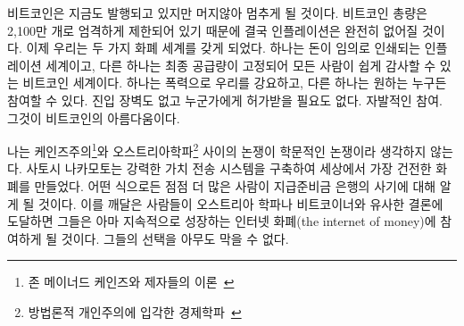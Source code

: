 \begin{comment}
	While Bitcoin is still inflationary, it will cease to be so rather soon.
	The strictly limited supply of 21 million bitcoins will eventually do
	away with inflation completely. We now have two monetary worlds: an
	inflationary one where money is printed arbitrarily, and the world of
	Bitcoin, where final supply is fixed and easily auditable for everyone.
	One is forced upon us by violence, the other can be joined by anyone who
	wishes to do so. No barriers to entry, no one to ask for permission.
	Voluntary participation. That is the beauty of Bitcoin.
\end{comment}
비트코인은 지금도 발행되고 있지만 머지않아 멈추게 될 것이다. 
비트코인 총량은 2,100만 개로 엄격하게 제한되어 있기 때문에 결국 인플레이션은 완전히 없어질 것이다.
이제 우리는 두 가지 화폐 세계를 갖게 되었다. 
하나는 돈이 임의로 인쇄되는 인플레이션 세계이고, 다른 하나는 최종 공급량이 고정되어 모든 사람이 쉽게 감사할 수 있는 비트코인 세계이다.
하나는 폭력으로 우리를 강요하고, 다른 하나는 원하는 누구든 참여할 수 있다.
진입 장벽도 없고 누군가에게 허가받을 필요도 없다. 
자발적인 참여. 그것이 비트코인의 아름다움이다.

\begin{comment}
	I would argue that the argument between Keynesian\footnote{Theories according to
		John Maynard Keynes and his deciples~\cite{wiki:keynesian}} and
	Austrian\footnote{School of economic thought based on methodological
		individualism~\cite{wiki:austrian}} economists is no longer purely academical.
	Satoshi managed to build a system for value transfer on steroids, creating the
	soundest money which ever existed in the process. One way or another, more and
	more people will learn about the scam which is fractional reserve banking. If
	they come to similar conclusions as most Austrians and Bitcoiners, they might
	join the ever-growing internet of money. Nobody can stop them if they choose to
	do so.
\end{comment}
나는 케인즈주의\footnote{존 메이너드 케인즈와 제자들의 이론~\cite{wiki:keynesian}}와 오스트리아학파\footnote{방법론적 개인주의에 입각한 경제학파~\cite{wiki:austrian}} 사이의 논쟁이 학문적인 논쟁이라 생각하지 않는다. 
사토시 나카모토는 강력한 가치 전송 시스템을 구축하여 세상에서 가장 건전한 화폐를 만들었다. 
어떤 식으로든 점점 더 많은 사람이 지급준비금 은행의 사기에 대해 알게 될 것이다. 
이를 깨달은 사람들이 오스트리아 학파나 비트코이너와 유사한 결론에 도달하면 
그들은 아마 지속적으로 성장하는 인터넷 화폐(the internet of money)에 참여하게 될 것이다. 
그들의 선택을 아무도 막을 수 없다.

